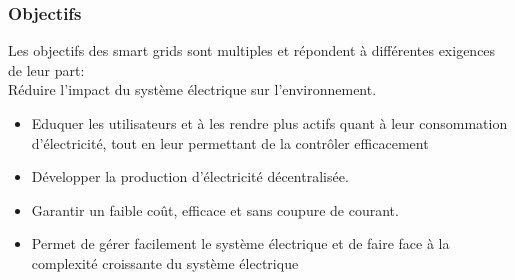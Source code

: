 \subsubsection{Objectifs}

Les objectifs des smart grids sont multiples et répondent à différentes exigences de leur part:
\\Réduire l'impact du système électrique sur l'environnement.
\begin{itemize}[label=\textbullet]
\item Eduquer les utilisateurs et à les rendre plus actifs quant à leur consommation d'électricité, tout en leur permettant de la contrôler efficacement
\item Développer la production d'électricité décentralisée.
\item Garantir un faible coût, efficace et sans coupure de courant.
\item Permet de gérer facilement le système électrique et de faire face à la complexité
croissante du système électrique
\end{itemize}